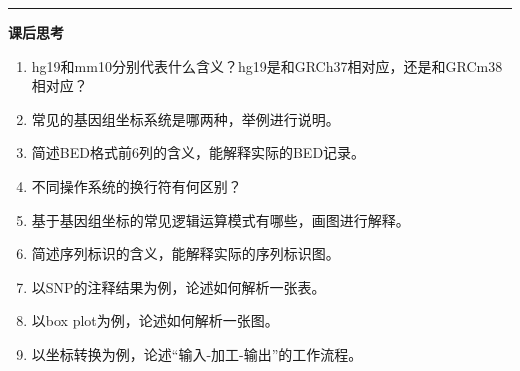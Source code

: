 \documentclass[11pt,a4paper,twoside]{book}
\begin{document}
\vspace{1cm}
\hrule height 3pt

\noindent
{\Large \bfseries \Coffeecup 课后思考}
\begin{enumerate}
  \item hg19和mm10分别代表什么含义？hg19是和GRCh37相对应，还是和GRCm38相对应？
  \item 常见的基因组坐标系统是哪两种，举例进行说明。
  \item 简述BED格式前6列的含义，能解释实际的BED记录。
  \item 不同操作系统的换行符有何区别？
  \item 基于基因组坐标的常见逻辑运算模式有哪些，画图进行解释。
  \item 简述序列标识的含义，能解释实际的序列标识图。
  \item 以SNP的注释结果为例，论述如何解析一张表。
  \item 以box plot为例，论述如何解析一张图。
  \item 以坐标转换为例，论述“输入-加工-输出”的工作流程。
\end{enumerate}
\end{document}
